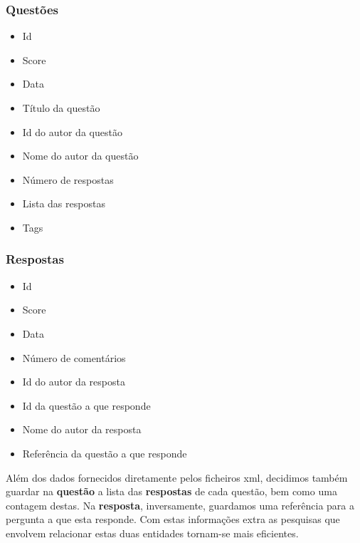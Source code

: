 \documentclass[10pt,a4paper]{article}
\begin{document}
        \subsubsection{Questões}
        \begin{multicols}{2}
        \begin{itemize}
            \item Id
            \item Score
            \item Data
            \item Título da questão
            \item Id do autor da questão
            \item Nome do autor da questão
            \item Número de respostas
            \item Lista das respostas
            \item Tags
        \end{itemize}
        \end{multicols}

        \subsubsection{Respostas}
        \begin{multicols}{2}
        \begin{itemize}
            \item Id
            \item Score
            \item Data
            \item Número de comentários
            \item Id do autor da resposta
            \item Id da questão a que responde
            \item Nome do autor da resposta
            \item Referência da questão a que responde
        \end{itemize}
        \end{multicols}
    Além dos dados fornecidos diretamente pelos ficheiros xml, decidimos também 
    guardar na \textbf{questão} a lista das \textbf{respostas} de cada questão, bem 
    como uma contagem destas. Na \textbf{resposta}, inversamente, guardamos uma
    referência para a pergunta a que esta responde. Com estas informações extra
    as pesquisas que envolvem relacionar estas duas entidades tornam-se 
    mais eficientes.
\end{document}
